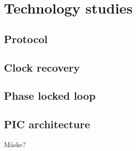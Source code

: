 \chapter{Technology studies}

\section{Protocol}

\section{Clock recovery}

\section{Phase locked loop}

\section{PIC architecture}
Måske?
